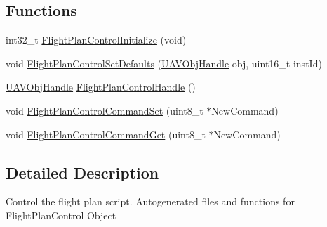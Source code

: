 \subsection*{\-Functions}
\begin{DoxyCompactItemize}
\item 
int32\-\_\-t \hyperlink{group___flight_plan_control_gaf98f8b3651c7338d7597c25dc25f74ba}{\-Flight\-Plan\-Control\-Initialize} (void)
\item 
void \hyperlink{group___flight_plan_control_ga30254eb06611055e08c3fd1580adca9c}{\-Flight\-Plan\-Control\-Set\-Defaults} (\hyperlink{targets_2_u_a_v_objects_2inc_2uavobjectmanager_8h_a279053e22be53ce9f895043aaeb91e3b}{\-U\-A\-V\-Obj\-Handle} obj, uint16\-\_\-t inst\-Id)
\item 
\hyperlink{targets_2_u_a_v_objects_2inc_2uavobjectmanager_8h_a279053e22be53ce9f895043aaeb91e3b}{\-U\-A\-V\-Obj\-Handle} \hyperlink{group___flight_plan_control_gae1fc4f8f0c6bf336c86948b65c0e0a50}{\-Flight\-Plan\-Control\-Handle} ()
\item 
void \hyperlink{group___flight_plan_control_gaf0c21d975165d0ba8846c2d9c8ae3af5}{\-Flight\-Plan\-Control\-Command\-Set} (uint8\-\_\-t $\ast$\-New\-Command)
\item 
void \hyperlink{group___flight_plan_control_ga400bbcdf14bef87490a9053f873a5983}{\-Flight\-Plan\-Control\-Command\-Get} (uint8\-\_\-t $\ast$\-New\-Command)
\end{DoxyCompactItemize}


\subsection{\-Detailed \-Description}
\-Control the flight plan script. \-Autogenerated files and functions for \-Flight\-Plan\-Control \-Object 

